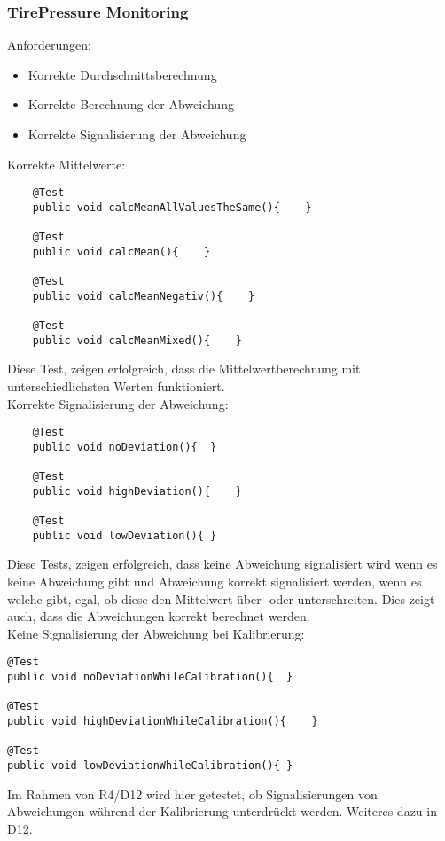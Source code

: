 \subsubsection{TirePressure Monitoring}
Anforderungen:
\begin{itemize}
	\item Korrekte Durchschnittsberechnung
	\item Korrekte Berechnung der Abweichung
	\item Korrekte Signalisierung der Abweichung
\end{itemize}

Korrekte Mittelwerte:
\begin{lstlisting}
	@Test
    public void calcMeanAllValuesTheSame(){    }
    
    @Test
    public void calcMean(){    }
    
    @Test
    public void calcMeanNegativ(){    }
    
    @Test
    public void calcMeanMixed(){    }
\end{lstlisting}
Diese Test, zeigen erfolgreich, dass die Mittelwertberechnung mit unterschiedlichsten Werten funktioniert.\\

Korrekte Signalisierung der Abweichung:
\begin{lstlisting}
	@Test
	public void noDeviation(){	}
	
	@Test
	public void highDeviation(){	}
	
	@Test
	public void lowDeviation(){	}
\end{lstlisting}
Diese Tests, zeigen erfolgreich, dass keine Abweichung signalisiert wird wenn es keine Abweichung gibt und Abweichung korrekt signalisiert werden, wenn es welche gibt, egal, ob diese den Mittelwert über- oder unterschreiten. Dies zeigt auch, dass die Abweichungen korrekt berechnet werden.\\

Keine Signalisierung der Abweichung bei Kalibrierung:
\begin{lstlisting}
@Test
public void noDeviationWhileCalibration(){	}

@Test
public void highDeviationWhileCalibration(){	}

@Test
public void lowDeviationWhileCalibration(){	}
\end{lstlisting}Im Rahmen von R4/D12 wird hier getestet, ob Signalisierungen von Abweichungen während der Kalibrierung unterdrückt werden. Weiteres dazu in D12.

